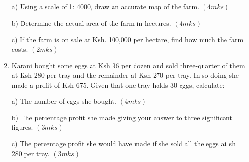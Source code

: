 \documentclass[
  a4paperpaper,
]{scrbook}
\begin{document}
\begin{tcolorbox}
\begin{enumerate}
  a) Using a scale of 1: 4000, draw an accurate map of the farm.
  \((4mks)\)

  b) Determine the actual area of the farm in hectares. \((4mks)\)

  c) If the farm is on sale at Ksh. 100,000 per hectare, find how much
  the farm costs. \((2mks)\)
\item
  Karani bought some eggs at Ksh 96 per dozen and sold three-quarter of
  them at Ksh 280 per tray and the remainder at Ksh 270 per tray. In so
  doing she made a profit of Ksh 675. Given that one tray holds 30 eggs,
  calculate:

  a) The number of eggs she bought. \((4mks)\)

  b) The percentage profit she made giving your answer to three
  significant figures. \((3mks)\)

  c) The percentage profit she would have made if she sold all the eggs
  at sh 280 per tray. \((3mks)\)
\end{enumerate}

\end{tcolorbox}
\end{document}
